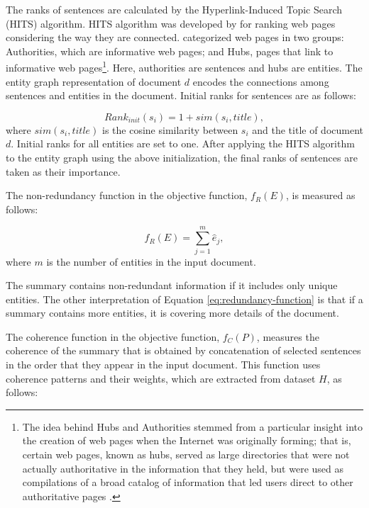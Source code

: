 The ranks of sentences are calculated  by the \mbox{Hyperlink-Induced} Topic Search (HITS) algorithm.
HITS algorithm was developed by  for ranking web pages considering the way they are connected.  
 categorized web pages in two groups:  Authorities, which are informative web pages; and Hubs, pages that link to informative web pages\footnote{The idea behind Hubs and Authorities stemmed from a particular insight into the creation of web pages when the Internet was originally forming; that is, certain web pages, known as hubs, served as large directories that were not actually authoritative in the information that they held, but were used as compilations of a broad catalog of information that led users direct to other authoritative pages \cite{}.}.
Here, authorities are sentences and hubs are entities.  
The entity graph representation of document $d$ encodes the connections among sentences and entities in the document. 
Initial ranks for sentences are as follows:

\begin{equation}
Rank_{init}(s_i)= 1 + sim (s_i, title),
\end{equation}
where $sim(s_i, title)$ is the cosine similarity between $s_i$ and the title of document $d$. 
Initial ranks for all entities are set to one. 
After applying the HITS algorithm to the entity graph using the above initialization, the final ranks of sentences are taken as their importance. 

The non-redundancy function in the objective function, $f_R(E)$,    
is measured as follows:

\begin{equation}
\label{eq:redundancy-function}
f_R(E) = \sum_{j=1}^{m}{\hat{e}_j},
\end{equation}
where $m$ is the number of entities in the input document. 

The summary contains non-redundant information if it includes only unique entities. 
The other interpretation of Equation \ref{eq:redundancy-function} is that if a summary contains more entities, it is covering more details of the document. 

The coherence function in the objective function, $f_C(P)$, measures the coherence of the summary that is obtained by concatenation of selected sentences in the order that they appear in the input document. 
This function uses coherence patterns and their weights, which are extracted from dataset $H$, as follows:

